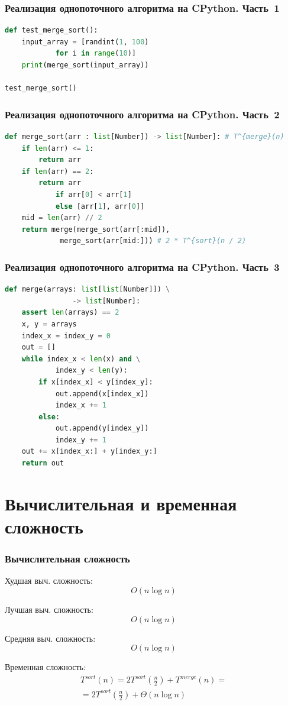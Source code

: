 \documentclass{beamer}
\begin{document}
	\begin{frame}[fragile]
		\frametitle{Реализация однопоточного алгоритма на CPython. Часть~1}
		\begin{lstlisting}[language=Python]		
def test_merge_sort():
	input_array = [randint(1, 100) 
			for i in range(10)]
	print(merge_sort(input_array))

test_merge_sort()
		\end{lstlisting}
	
	\end{frame}

	\begin{frame}[fragile]
		\frametitle{Реализация однопоточного алгоритма на CPython. Часть~2}
		\begin{lstlisting}[language=Python]		
def merge_sort(arr : list[Number]) -> list[Number]: # T^{merge}(n)
	if len(arr) <= 1:
		return arr
	if len(arr) == 2:
		return arr 
			if arr[0] < arr[1] 
			else [arr[1], arr[0]]
	mid = len(arr) // 2
	return merge(merge_sort(arr[:mid]), 
		     merge_sort(arr[mid:])) # 2 * T^{sort}(n / 2)
		\end{lstlisting}
	
	\end{frame}

	\begin{frame}[fragile]
		\frametitle{Реализация однопоточного алгоритма на CPython. Часть~3}
		\begin{lstlisting}[language=Python]		
def merge(arrays: list[list[Number]]) \
				-> list[Number]:
	assert len(arrays) == 2
	x, y = arrays
	index_x = index_y = 0
	out = []
	while index_x < len(x) and \
			index_y < len(y):
		if x[index_x] < y[index_y]:
			out.append(x[index_x])
			index_x += 1
		else:
			out.append(y[index_y])
			index_y += 1
	out += x[index_x:] + y[index_y:]
	return out
		\end{lstlisting}
	
	\end{frame}


	\section{Вычислительная и временная сложность}
	\begin{frame}
		\frametitle{Вычислительная сложность}
		
		Худшая выч. сложность:
		\begin{equation}
			O(n\log{}{n})
		\end{equation}
		
		Лучшая выч. сложность:
		\begin{equation}
			O(n\log{}{n})
		\end{equation}
		
		Средняя выч. сложность:
		\begin{equation}
			O(n\log{}{n})
		\end{equation}
	
		Временная сложность:
		\begin{multline}
			T^{sort}(n)=2T^{sort}\left(\frac{n}{2}\right)+T^{merge}(n)=\\=2T^{sort}\left(\frac{n}{2}\right)+\Theta(n\log{}{n})
		\end{multline}
	\end{frame}
	
\end{document}
